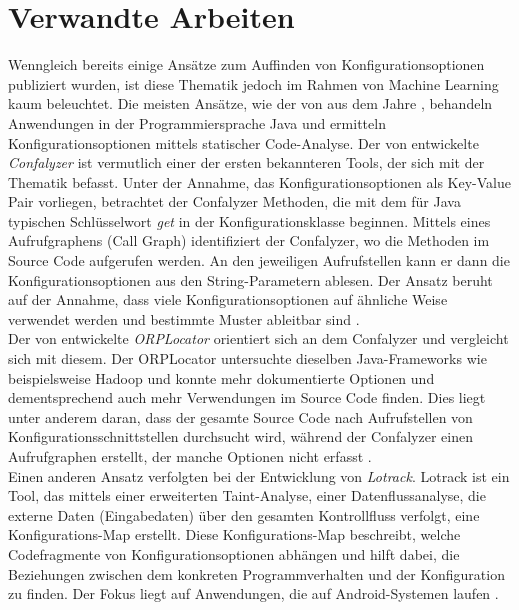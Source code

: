 \documentclass[german,bachelor]{swsLeipzig}
\begin{document}
\chapter{Verwandte Arbeiten}\label{Verwandte Arbeiten}
Wenngleich bereits einige Ansätze zum Auffinden von Konfigurationsoptionen publiziert wurden, ist diese Thematik jedoch im Rahmen von
Machine Learning kaum beleuchtet.
Die meisten Ansätze, wie der von \citeauthor{10.1145/1985793.1985812} aus dem Jahre \citeyear{10.1145/1985793.1985812},
behandeln Anwendungen in der Programmiersprache Java und ermitteln Konfigurationsoptionen mittels statischer Code-Analyse.
Der von \citeauthor{10.1145/1985793.1985812} entwickelte \textit{Confalyzer} ist vermutlich einer der ersten bekannteren
Tools, der sich mit der Thematik befasst.
Unter der Annahme, das Konfigurationsoptionen als Key-Value Pair vorliegen, betrachtet der Confalyzer Methoden, die mit
dem für Java typischen Schlüsselwort \textit{get} in der Konfigurationsklasse beginnen.
Mittels eines Aufrufgraphens (Call Graph) identifiziert der Confalyzer, wo die Methoden im Source Code aufgerufen werden.
An den jeweiligen Aufrufstellen kann er dann die Konfigurationsoptionen aus den String-Parametern ablesen.
Der Ansatz beruht auf der Annahme, dass viele Konfigurationsoptionen auf ähnliche Weise verwendet werden und bestimmte
Muster ableitbar sind \cite[]{10.1145/1985793.1985812}.\\
\indent Der von \citeauthor{7774519} entwickelte \textit{ORPLocator} orientiert sich an dem Confalyzer und vergleicht sich mit diesem.
Der ORPLocator untersuchte dieselben Java-Frameworks wie beispielsweise Hadoop und konnte mehr dokumentierte
Optionen und dementsprechend auch mehr Verwendungen im Source Code finden.
Dies liegt unter anderem daran, dass der gesamte Source Code nach Aufrufstellen von Konfigurationsschnittstellen durchsucht wird,
während der Confalyzer einen Aufrufgraphen erstellt, der manche Optionen nicht erfasst \cite[]{7774519}.\\
\indent Einen anderen Ansatz verfolgten \citeauthor{8049300} bei der Entwicklung von \textit{Lotrack}.
Lotrack ist ein Tool, das mittels einer erweiterten Taint-Analyse, einer Datenflussanalyse, die externe Daten
(Eingabedaten) über den gesamten Kontrollfluss verfolgt, eine Konfigurations-Map erstellt.
Diese Konfigurations-Map beschreibt, welche Codefragmente von Konfigurationsoptionen abhängen und hilft dabei, die
Beziehungen zwischen dem konkreten Programmverhalten und der Konfiguration zu finden.
Der Fokus liegt auf Anwendungen, die auf Android-Systemen laufen \cite[]{8049300}. \\
\end{document}
